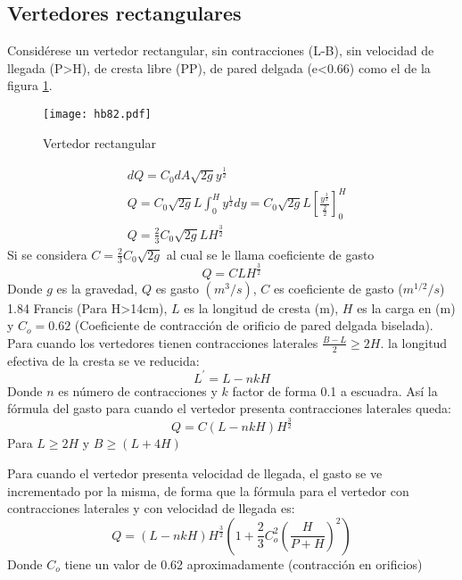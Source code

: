 \subsection{Vertedores rectangulares}

Considérese un vertedor rectangular, sin contracciones (L-B), sin velocidad de llegada (P>H), de cresta libre (PP), de pared delgada (e<0.66) como el de la figura \ref{hb82}.

\begin{figure}[h!]
\centering
  \texttt{[image: hb82.pdf]}
  \caption{Vertedor rectangular}
  \label{hb82}
\end{figure}
\begin{align*}
    &dQ = C_0dA \sqrt{2g}y^{\frac{1}{2}}\\
    &Q = C_0 \sqrt{2g}L \int_0^H y^{\frac{1}{2}}dy = C_0 \sqrt{2g}L \left[\frac{y^{\frac{3}{2}}}{\frac{2}{2}}\right]_0^H\\
    &Q = \frac{2}{3} C_0 \sqrt{2g}LH^{\frac{3}{2}}
\end{align*}
Si se considera $C=\frac{2}{3} C_0 \sqrt{2g}$ al cual se le llama coeficiente de gasto
\begin{equation}
    Q = CLH^{\frac{3}{2}}
    \label{eq:coeficientedegasto}
\end{equation}
Donde $g$ es la gravedad, $Q$ es gasto $(m^3/s)$, $C$ es coeficiente de gasto ($m^{1/2}/s$) 1.84 Francis (Para H>14cm),
$L$ es la longitud de cresta (m), $H$ es la carga en (m) y $C_o=0.62$ (Coeficiente de contracción de orificio de pared delgada biselada).
Para cuando los vertedores tienen contracciones laterales $\frac{B-L}{2}\geq 2H$. la longitud efectiva de la cresta se ve reducida:
\begin{equation}
    L^{\prime} = L - nkH
\end{equation}
Donde $n$ es número de contracciones y $k$ factor de forma 0.1 a escuadra.
Así la fórmula del gasto para cuando el vertedor presenta contracciones laterales queda:
\begin{equation}
    Q = C\left(L - nkH\right)H^{\frac{3}{2}}
\end{equation}
Para $L\geq 2H$ y $B\geq (L+4H)$

Para cuando el vertedor presenta velocidad de llegada, el gasto se ve incrementado por la misma, de forma que la fórmula para el vertedor con contracciones laterales y con velocidad de llegada es:
\begin{equation}
        Q =\left(L - nkH\right)H^{\frac{3}{2}}\left(1 + \frac{2}{3}C_o^2\left(\frac{H}{P + H}\right)^2\right)
\end{equation}
Donde $C_o$ tiene un valor de 0.62 aproximadamente (contracción en orificios)

